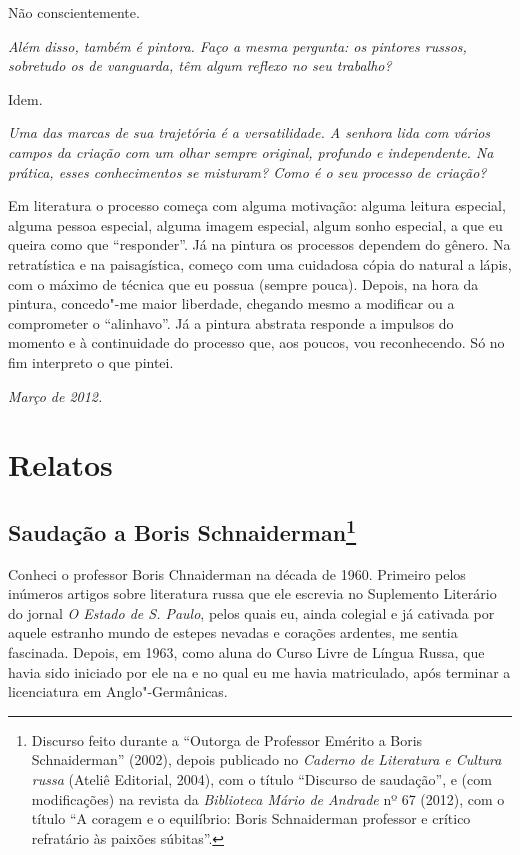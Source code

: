 Não conscientemente.

\medskip

\emph{Além disso, também é pintora. Faço a mesma pergunta: os pintores
russos, sobretudo os de vanguarda, têm algum reflexo no seu trabalho?}

Idem.

\medskip

\emph{Uma das marcas de sua trajetória é a versatilidade. A senhora lida
com vários campos da criação com um olhar sempre original, profundo e
independente. Na prática, esses conhecimentos se misturam? Como é o seu
processo de criação?}

Em literatura o processo começa com alguma motivação: alguma leitura
especial, alguma pessoa especial, alguma imagem especial, algum sonho
especial, a que eu queira como que ``responder''. Já na pintura os
processos dependem do gênero. Na retratística e na paisagística, começo
com uma cuidadosa cópia do natural a lápis, com o máximo de técnica que
eu possua (sempre pouca). Depois, na hora da pintura, concedo"-me maior
liberdade, chegando mesmo a modificar ou a comprometer o ``alinhavo''.
Já a pintura abstrata responde a impulsos do momento e à continuidade do
processo que, aos poucos, vou reconhecendo. Só no fim interpreto o que
pintei.

\begin{flushright}
\emph{Março de 2012.}
\end{flushright}

\part{Relatos}

\chapter{Saudação a Boris Schnaiderman\footnote{Discurso feito durante a
  ``Outorga de Professor Emérito a Boris Schnaiderman'' (2002), depois
  publicado no \emph{Caderno de Literatura e Cultura russa} (Ateliê
  Editorial, 2004), com o título ``Discurso de saudação'', e (com
 modificações) na revista da \emph{Biblioteca Mário de
  Andrade} nº 67 (2012), com o título ``A coragem e o equilíbrio: Boris
  Schnaiderman professor e crítico refratário às paixões súbitas''.}}

Conheci o professor Boris Chnaiderman na década de 1960. Primeiro pelos
inúmeros artigos sobre literatura russa que ele escrevia no Suplemento
Literário do jornal \emph{O Estado de S. Paulo}, pelos quais eu, ainda
colegial e já cativada por aquele estranho mundo de estepes nevadas e
corações ardentes, me sentia fascinada. Depois, em 1963, como aluna do
Curso Livre de Língua Russa, que havia sido iniciado por ele na  e no
qual eu me havia matriculado, após terminar a licenciatura em
Anglo"-Germânicas.

